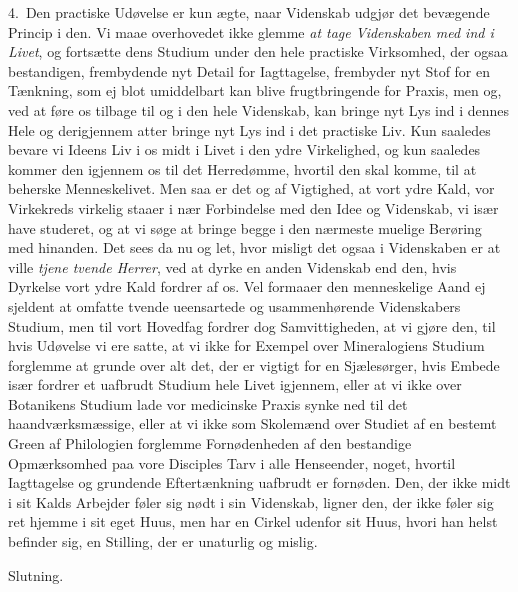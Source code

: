 \documentclass[12pt,a4paper]{book}
\newcommand{\apage}[1]{\marginnote{\footnotesize\textit{[#1]}}}
\begin{document}
4.~Den practiske Udøvelse er kun ægte, naar Videnskab udgjør det bevægende Princip
i den. Vi maae overhovedet ikke glemme \emph{at tage Videnskaben med ind i Livet},
og fortsætte dens Studium under den hele practiske Virksomhed, der ogsaa
bestandigen, frembydende nyt Detail for Iagttagelse, frembyder nyt Stof for en
Tænkning, som ej blot umiddelbart kan blive frugtbringende for Praxis, men og, ved
at føre os tilbage til og i den hele Videnskab, kan bringe nyt Lys ind i dennes
Hele og derigjennem atter bringe nyt Lys ind i det practiske Liv. Kun saaledes
bevare vi Ideens Liv i os midt i Livet i den ydre Virkelighed, og kun saaledes
kommer den igjennem os til det Herredømme, hvortil den skal komme, til at beherske
Menneskelivet. Men saa er det og af Vigtighed, at vort ydre Kald, vor Virkekreds
virkelig staaer i nær Forbindelse med den Idee og Videnskab, vi især have studeret,
og at vi søge at bringe begge i den nærmeste muelige Berøring med hinanden. Det
\apage{202} sees da nu og let, hvor misligt det ogsaa i Videnskaben er at ville \emph{tjene
tvende Herrer}, ved at dyrke en anden Videnskab end den, hvis Dyrkelse vort ydre
Kald fordrer af os. Vel formaaer den menneskelige Aand ej sjeldent at omfatte
tvende ueensartede og usammenhørende Videnskabers Studium, men til vort Hovedfag
fordrer dog Samvittigheden, at vi gjøre den, til hvis Udøvelse vi ere satte, at vi
ikke for Exempel over Mineralogiens Studium forglemme at grunde over alt det, der
er vigtigt for en Sjælesørger, hvis Embede især fordrer et uafbrudt Studium hele
Livet igjennem, eller at vi ikke over Botanikens Studium lade vor medicinske Praxis
synke ned til det haandværksmæssige, eller at vi ikke som Skolemænd over Studiet af
en bestemt Green af Philologien forglemme Fornødenheden af den bestandige
Opmærksomhed paa vore Disciples Tarv i alle Henseender, noget, hvortil Iagttagelse
og grundende Eftertænkning uafbrudt er fornøden. Den, der ikke midt i sit Kalds
Arbejder føler sig nødt i sin Videnskab, ligner den, der ikke føler sig ret hjemme
i sit eget Huus, men har en Cirkel udenfor sit Huus, hvori han helst befinder sig,
en Stilling, der er unaturlig og mislig.

\begin{center}\large Slutning.\end{center}
\end{document}
